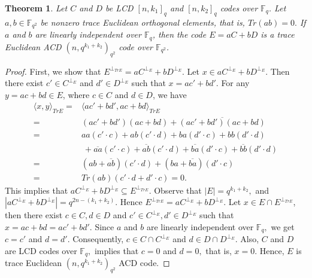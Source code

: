 \documentclass[sn-mathphys-num]{sn-jnl}%
\theoremstyle{thmstyleone}%
\newtheorem{theorem}{Theorem}%
\theoremstyle{thmstyletwo}%
\theoremstyle{thmstylethree}%
\begin{document}
\begin{theorem}
	Let $C$ and $D$ be LCD $[n,k_1]_q$ and $[n,k_2]_q$ codes over $\mathbb{F}_q$. Let $a,b\in \mathbb{F}_{q^2}$ be nonzero trace Euclidean orthogonal elements, that is, $Tr(ab)=0.$ If $a$ and $b$ are linearly independent over $\mathbb{F}_q$,  then the code $E=aC+bD$ is a trace Euclidean ACD $(n,q^{k_1+k_2})_{q^2}$ code over $\mathbb{F}_{q^2}$.
\end{theorem}
\begin{proof}
	First, we show that $E^{\perp_{TrE}}=aC^{\perp_E}+bD^{\perp_E}.$ Let $x\in aC^{\perp_E}+bD^{\perp_E}$. Then there exist $c'\in C^{\perp_E}$ and $d'\in D^{\perp_E}$ such that $x=ac'+bd'.$ For any $y= ac+bd\in E$, where $c\in C$ and $d\in D$, we have
	\begin{align*}
		\langle x,y\rangle_{TrE}=&\langle ac'+bd',ac+bd\rangle_{TrE}\\
		=& (ac'+bd')(ac+bd)+\overline{(ac'+bd')(ac+bd)}\\
		=& aa (c'\cdot c)+ab (c'\cdot d)+ba(d'\cdot c)+bb(d'\cdot d) \\
		&\ + \overline{aa} (c'\cdot c)+\overline{ab} (c'\cdot d)+\overline{ba}(d'\cdot c)+\overline{bb}(d'\cdot d)\\
		=& (ab+\overline{ab}) (c'\cdot d)+(ba+\overline{ba})(d'\cdot c)\\
		=& Tr(ab)(c'\cdot d+d'\cdot c)=0. 
	\end{align*}
	This implies that $aC^{\perp_E}+bD^{\perp_E}\subseteq E^{\perp_{TrE}}.$ Observe that $|E|=q^{k_1+k_2},$ and  $|aC^{\perp_E}+bD^{\perp_E}|=q^{2n-(k_1+k_2)}.$ Hence $E^{\perp_{TrE}}=aC^{\perp_E}+bD^{\perp_E}.$ 
	Let $x\in E\cap E^{\perp_{TrE}}$, then there exist $c\in C,d\in D$ and $c'\in C^{\perp_E},d'\in D^{\perp_E}$ such that $x=ac+bd=ac'+bd'.$ Since $a$ and $b$ are linearly independent over $\mathbb{F}_q,$ we get $c=c'$ and $d=d'$. Consequently,  $c\in C\cap C^{\perp_E}$ and $d\in D\cap D^{\perp_E}$. Also, $C$ and $D$ are LCD codes over $\mathbb{F}_q,$  implies that $c=0$ and $d=0,$ that is, $x=0.$ Hence, $E$ is trace Euclidean $(n,q^{k_1+k_2})_{q^2}$ ACD code.
\end{proof}
\end{document}
